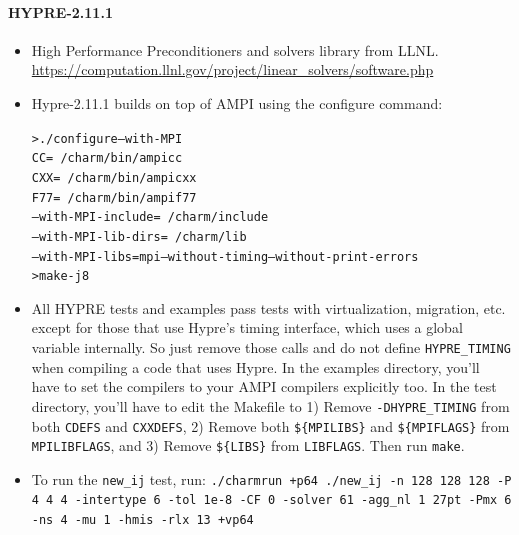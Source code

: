 \documentclass[10pt]{article}
\begin{document}
\paragraph{HYPRE-2.11.1}

    \begin{itemize}
    \item
      High Performance Preconditioners and solvers library from LLNL. \url{https://computation.llnl.gov/project/linear_solvers/software.php}
    \item
      Hypre-2.11.1 builds on top of AMPI using the configure
      command:
      \begin{alltt}
> ./configure --with-MPI
      CC=~/charm/bin/ampicc
      CXX=~/charm/bin/ampicxx
      F77=~/charm/bin/ampif77
      --with-MPI-include=~/charm/include
      --with-MPI-lib-dirs=~/charm/lib
      --with-MPI-libs=mpi --without-timing --without-print-errors
> make -j8
      \end{alltt}
    \item
      All HYPRE tests and examples pass tests with virtualization,
      migration, etc. except for those that use Hypre's timing
      interface, which uses a global variable internally. So just remove
      those calls and do not define \texttt{HYPRE\_TIMING} when compiling a code
      that uses Hypre. In the examples directory, you'll have to set the
      compilers to your AMPI compilers explicitly too. In the test
      directory, you'll have to edit the Makefile to 1) Remove
      \texttt{-DHYPRE\_TIMING} from both \texttt{CDEFS} and \texttt{CXXDEFS}, 2) Remove both
      \texttt{\$\{MPILIBS\}} and \texttt{\$\{MPIFLAGS\}} from \texttt{MPILIBFLAGS}, and 3) Remove
      \texttt{\$\{LIBS\}} from \texttt{LIBFLAGS}. Then run \texttt{make}.
    \item
      To run the \texttt{new\_ij} test, run: \texttt{./charmrun +p64 ./new\_ij -n 128 128
      128 -P 4 4 4 -intertype 6 -tol 1e-8 -CF 0 -solver 61 -agg\_nl 1
      27pt -Pmx 6 -ns 4 -mu 1 -hmis -rlx 13 +vp64}
    \end{itemize}
\end{document}
